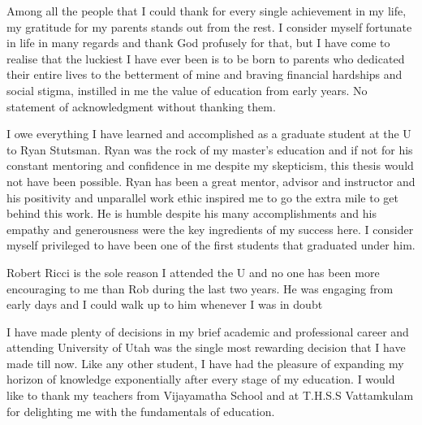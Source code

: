 Among all the people that I could thank for every single achievement in my life,
my gratitude for my parents stands out from the rest. I consider myself fortunate
in life in many regards and thank God profusely for that, but I have come to realise
that the luckiest I have ever been is to be born to parents who dedicated their 
entire lives to the betterment of mine and braving financial hardships and social
stigma, instilled in me the value of education from early years. No statement of 
acknowledgment without thanking them.

I owe everything I have learned and accomplished as a graduate student at 
the U to Ryan Stutsman. Ryan was the rock of my master's education and if not for his  constant mentoring
and confidence in me despite my skepticism, this thesis would not have been possible.
Ryan has been a great mentor, advisor and instructor and his positivity  and 
unparallel work ethic inspired me to go the extra mile to get behind this work.
He is humble despite his many accomplishments and his empathy and generousness were 
the key ingredients of my success here. I consider myself privileged to have been
one of the first students that graduated under him.

Robert Ricci is the sole reason I attended the U and no one has been more encouraging
to me than Rob during the last two years. He was engaging from early days and I could
walk up to him whenever I was in doubt


I have made plenty of decisions in my brief academic and professional
career and attending University of Utah was the single most rewarding decision 
that I have made till now. Like any other student, I have had the pleasure of 
expanding my horizon of knowledge exponentially after every stage of my education.
I would like to thank my teachers from Vijayamatha School and at T.H.S.S Vattamkulam
for delighting me with the fundamentals of education. 
